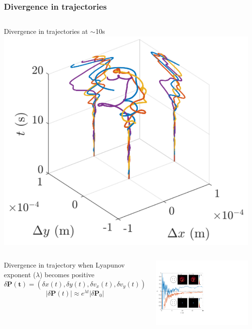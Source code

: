 \documentclass{beamer}
\begin{document}
\begin{frame}
\frametitle{Divergence in trajectories}

\begin{columns}
Divergence in trajectories at $\sim$10s
\includegraphics[width=\textwidth]{../data/2d/evolution/evolution}
\end{columns}

\begin{columns}

Divergence in trajectory when Lyapunov exponent ($\lambda$) becomes positive
$$
\delta \mathbf{P(t)} = (\delta x(t), \delta y(t), \delta v_x(t), \delta v_y(t))
$$
$$
|\delta\mathbf{P}(t)| \approx e^{\lambda t} |\delta \mathbf{P}_0|
$$


\includegraphics[width=\textwidth]{../data/2d/lyap/lyap}
\end{columns}

\end{frame}
\end{document}
